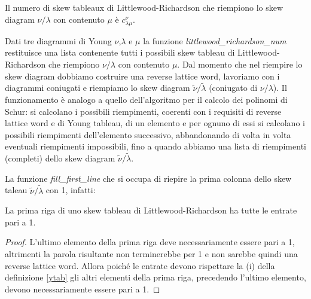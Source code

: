 \begin{prop}
Il numero di skew tableaux di Littlewood-Richardson che riempiono lo
skew diagram $\nu/\lambda$ con contenuto $\mu$ \`e $c_{\lambda \mu}^{\nu}$.
\end{prop}

Dati tre diagrammi di Young $\nu$,$\lambda$ e $\mu$ la funzione
\emph{littlewood\_richardson\_num} restituisce una lista contenente
tutti i possibili skew tableau di Littlewood-Richardson che riempiono
$\nu/\lambda$ con contenuto $\mu$. Dal momento che nel riempire lo
skew diagram dobbiamo costruire una reverse lattice word, lavoriamo
con i diagrammi coniugati e riempiamo lo skew diagram
$\tilde{\nu}/\tilde{\lambda}$ (coniugato di $\nu/\lambda$).
Il funzionamento \`e analogo a quello dell'algoritmo per il calcolo
dei polinomi di Schur: si calcolano i possibili riempimenti, coerenti
con i requisiti di reverse lattice word e di Young tableau, di un
elemento e per ognuno di essi si calcolano i possibili riempimenti
dell'elemento successivo, abbandonando di volta in volta eventuali
riempimenti impossibili, fino a quando abbiamo una lista di
riempimenti (completi) dello skew diagram $\tilde{\nu}/\tilde{\lambda}$.

La funzione \emph{fill\_first\_line} che si occupa di riepire la prima
colonna dello skew taleau $\tilde{\nu}/\tilde{\lambda}$ con 1, infatti:

\begin{oss}
La prima riga di uno skew tableau di Littlewood-Richardson ha tutte le
entrate pari a 1.
\begin{proof}
L'ultimo elemento della prima riga deve necessariamente essere pari a
1, altrimenti la parola risultante non terminerebbe per 1 e non
sarebbe quindi una reverse lattice word. Allora poich\'e le entrate
devono rispettare la (i) della definizione \ref{ytab} gli altri
elementi della prima riga, precedendo l'ultimo elemento, devono
necessariamente essere pari a 1.
\end{proof}
\end{oss}

